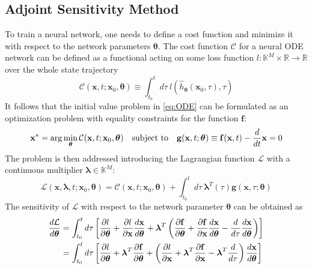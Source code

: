 \subsection{Adjoint Sensitivity Method}
To train a neural network, one needs to define a cost function and minimize it with respect to the network parameters $\boldsymbol{\theta}$.
The cost function $\mathcal{C}$ for a neural ODE network can be defined as a functional 
acting on some loss function $l: \mathbb{K}^M \times \mathbb{R} \to \mathbb{R}$ over the whole state trajectory
\begin{equation}
  \label{eq:cost_function}
  \mathcal{C}(\mathbf{x}, t; \mathbf{x}_0, \boldsymbol{\theta}) \equiv \int_{t_0}^{t} d\tau\ l(\hat{h}_{\boldsymbol{\theta}}(\mathbf{x}_0 , \tau), \tau)
\end{equation}
It follows that the initial value problem in \eqref{eq:ODE} can be formulated as an optimization problem with equality constraints for the function $\mathbf{f}$:
\begin{equation}
  \label{eq:opt_problem}
  \mathbf{x}^* = \arg\min_{\boldsymbol{\theta}} \mathcal{C}(\mathbf{x}, t; \mathbf{x}_0, \boldsymbol{\theta}) \quad \text{subject to} \quad \mathbf{g}(\mathbf{x}, t; \boldsymbol{\theta}) \equiv \mathbf{f}(\mathbf{x}, t) - \frac{d}{dt}\mathbf{x} = 0
\end{equation}
The problem is then addressed introducing the Lagrangian function $\mathcal{L}$ with a continuous multiplier $\boldsymbol{\lambda} \in \mathbb{K}^M$:
$$
\mathcal{L}(\mathbf{x}, \boldsymbol{\lambda}, t; \mathbf{x}_0, \boldsymbol{\theta}) = \mathcal{C}(\mathbf{x}, t; \mathbf{x}_0, \boldsymbol{\theta}) + \int_{t_0}^{t} d\tau\ \boldsymbol{\lambda}^T(\tau) \mathbf{g}(\mathbf{x}, \tau; \boldsymbol{\theta})
$$
The sensitivity of $\mathcal{L}$ with respect to the network parameter $\boldsymbol{\theta}$ can be obtained as
\begin{align*}
  \frac{d\mathcal{L}}{d\boldsymbol{\theta}} 
  &= \int_{t_0}^{t} d\tau \left[\frac{\partial l}{\partial \boldsymbol{\theta}} + \frac{\partial l}{\partial \mathbf{x}}\frac{d\mathbf{x}}{d\boldsymbol{\theta}} + \boldsymbol{\lambda}^T \left(\frac{\partial \mathbf{f}}{\partial \boldsymbol{\theta}} + \frac{\partial \mathbf{f}}{\partial \mathbf{x}}\frac{d\mathbf{x}}{d\boldsymbol{\theta}} - \frac{d}{d\tau}\frac{d\mathbf{x}}{d\boldsymbol{\theta}} \right) \right] \\
  &= \int_{t_0}^{t} d\tau \left[\frac{\partial l}{\partial \boldsymbol{\theta}} + \boldsymbol{\lambda}^T \frac{\partial \mathbf{f}}{\partial \boldsymbol{\theta}} + \left(\frac{\partial l}{\partial \mathbf{x}} + \boldsymbol{\lambda}^T \frac{\partial \mathbf{f}}{\partial \mathbf{x}} - \boldsymbol{\lambda}^T \frac{d}{d\tau}\right) \frac{d\mathbf{x}}{d\boldsymbol{\theta}} \right]                                 
\end{align*}
